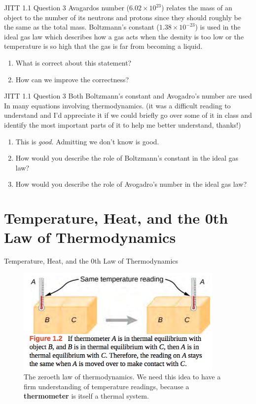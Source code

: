 \documentclass{beamer}
\begin{document}
\begin{frame}{JITT 1.1 Question 3}
\small
Avagardos number ($6.02 \times 10^{23}$) relates the mass of an object to the number of its neutrons and protons since they should roughly be the same as the total mass. Boltzmann's constant ($1.38 \times 10^{-23}$) is used in the ideal gas law which describes how a gas acts when the desnity is too low or the temperature is so high that the gas is far from becoming a liquid.
\begin{enumerate}
\item What is correct about this statement?
\item How can we improve the correctness?
\end{enumerate}
\end{frame}

\begin{frame}{JITT 1.1 Question 3}
\small
Both Boltzmann’s constant and Avogadro’s number are used In many equations involving thermodynamics.  (it was a difficult reading to understand and I’d appreciate it if we could briefly go over some of it in class and identify the most important parts of it to help me better understand, thanks!) 
\begin{enumerate}
\item This is \textit{good.}  Admitting we don't know is good.
\item How would you describe the role of Boltzmann's constant in the ideal gas law?
\item How would you describe the role of Avogadro's number in the ideal gas law?
\end{enumerate}
\end{frame}

\section{Temperature, Heat, and the 0th Law of Thermodynamics}

\begin{frame}{Temperature, Heat, and the 0th Law of Thermodynamics}
\begin{figure}
\centering
\includegraphics[width=0.9\textwidth,trim=0cm 4cm 0cm 0cm,clip=true]{figures/zero.png}
\caption{\label{fig:zero} The zeroeth law of thermodynamics.  We need this idea to have a firm understanding of temperature readings, because a \textbf{thermometer} is itself a thermal system.}
\end{figure}
\end{frame}
\end{document}
